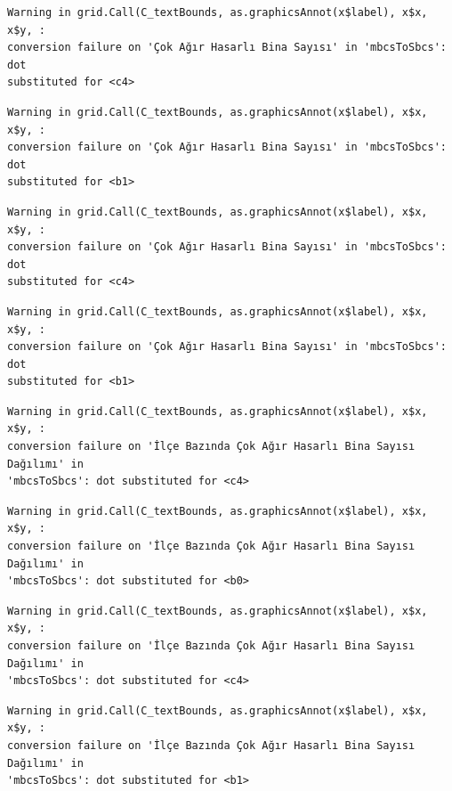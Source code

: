 \documentclass[
  11pt,
  a4paper,
  DIV=11,
  numbers=noendperiod]{scrartcl}
\begin{document}
\begin{verbatim}
Warning in grid.Call(C_textBounds, as.graphicsAnnot(x$label), x$x, x$y, :
conversion failure on 'Çok Ağır Hasarlı Bina Sayısı' in 'mbcsToSbcs': dot
substituted for <c4>
\end{verbatim}

\begin{verbatim}
Warning in grid.Call(C_textBounds, as.graphicsAnnot(x$label), x$x, x$y, :
conversion failure on 'Çok Ağır Hasarlı Bina Sayısı' in 'mbcsToSbcs': dot
substituted for <b1>
\end{verbatim}

\begin{verbatim}
Warning in grid.Call(C_textBounds, as.graphicsAnnot(x$label), x$x, x$y, :
conversion failure on 'Çok Ağır Hasarlı Bina Sayısı' in 'mbcsToSbcs': dot
substituted for <c4>
\end{verbatim}

\begin{verbatim}
Warning in grid.Call(C_textBounds, as.graphicsAnnot(x$label), x$x, x$y, :
conversion failure on 'Çok Ağır Hasarlı Bina Sayısı' in 'mbcsToSbcs': dot
substituted for <b1>
\end{verbatim}

\begin{verbatim}
Warning in grid.Call(C_textBounds, as.graphicsAnnot(x$label), x$x, x$y, :
conversion failure on 'İlçe Bazında Çok Ağır Hasarlı Bina Sayısı Dağılımı' in
'mbcsToSbcs': dot substituted for <c4>
\end{verbatim}

\begin{verbatim}
Warning in grid.Call(C_textBounds, as.graphicsAnnot(x$label), x$x, x$y, :
conversion failure on 'İlçe Bazında Çok Ağır Hasarlı Bina Sayısı Dağılımı' in
'mbcsToSbcs': dot substituted for <b0>
\end{verbatim}

\begin{verbatim}
Warning in grid.Call(C_textBounds, as.graphicsAnnot(x$label), x$x, x$y, :
conversion failure on 'İlçe Bazında Çok Ağır Hasarlı Bina Sayısı Dağılımı' in
'mbcsToSbcs': dot substituted for <c4>
\end{verbatim}

\begin{verbatim}
Warning in grid.Call(C_textBounds, as.graphicsAnnot(x$label), x$x, x$y, :
conversion failure on 'İlçe Bazında Çok Ağır Hasarlı Bina Sayısı Dağılımı' in
'mbcsToSbcs': dot substituted for <b1>
\end{verbatim}
\end{document}
